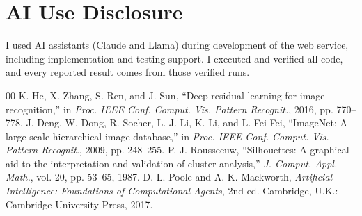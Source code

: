 \documentclass[conference]{IEEEtran}
\begin{document}
\section*{AI Use Disclosure}
I used AI assistants (Claude and Llama) during development of
the web service, including implementation and testing support.
I executed and verified all code, and every reported result
comes from those verified runs.

\begin{thebibliography}{00}
 K. He, X. Zhang, S. Ren, and J. Sun, ``Deep residual
learning for image recognition,'' in \textit{Proc. IEEE Conf. Comput.
Vis. Pattern Recognit.}, 2016, pp. 770--778.
 J. Deng, W. Dong, R. Socher, L.-J. Li, K. Li, and
L. Fei-Fei, ``ImageNet: A large-scale hierarchical image database,''
in \textit{Proc. IEEE Conf. Comput. Vis. Pattern Recognit.}, 2009,
pp. 248--255.
 P. J. Rousseeuw, ``Silhouettes: A graphical
aid to the interpretation and validation of cluster analysis,''
\textit{J. Comput. Appl. Math.}, vol. 20, pp. 53--65, 1987.
 D. L. Poole and A. K. Mackworth,
\textit{Artificial Intelligence: Foundations of Computational
Agents}, 2nd ed. Cambridge, U.K.: Cambridge University Press, 2017.
\end{thebibliography}
\end{document}
